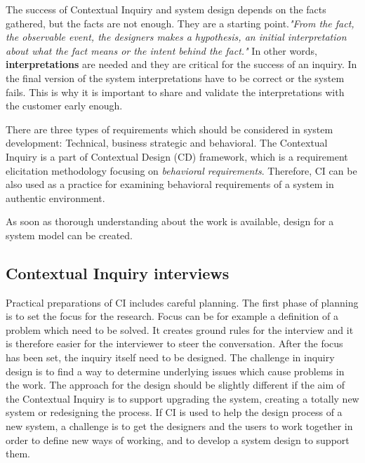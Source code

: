 \documentclass[12pt,a4paper,oneside,pdftex]{report}
\begin{document}
The success of Contextual Inquiry and system design depends on the facts gathered, but the facts are not enough. They are a starting point.\textit{"From the fact, the observable event, the designers makes a hypothesis, an initial interpretation about what the fact means or the intent behind the fact."}\cite{RefWorks:21} In other words, \textbf{interpretations} are needed and they are critical for the success of an inquiry. In the final version of the system interpretations have to be correct or the system fails. This is why it is important to share and validate the interpretations with the customer early enough. \cite{RefWorks:21}

There are three types of requirements which should be considered in system development: Technical, business strategic and behavioral. The Contextual Inquiry is a part of Contextual Design (CD) framework, which is a requirement elicitation methodology focusing on  \emph{behavioral requirements}. Therefore, CI can be also used as a practice for examining behavioral requirements of a system in authentic environment. \cite{RefWorks:33}

As soon as thorough understanding about the work is available, design for a system model can be created.\cite{RefWorks:14} 

\subsection{Contextual Inquiry interviews}

Practical preparations of CI includes careful planning. The first phase of planning is to set the focus for the research. Focus can be for example a definition of a problem which need to be solved. It creates ground rules for the interview and it is therefore easier for the interviewer to steer the conversation. After the focus has been set, the inquiry itself need to be designed. The challenge in inquiry design is to find a way to determine underlying issues which cause problems in the work. The approach for the design should be slightly different if the aim of the Contextual Inquiry is to support upgrading the system, creating a totally new system or redesigning the process. If CI is used to help the design process of a new system, a challenge is to get the designers and the users to work together in order to define new ways of working, and to develop a system design to support them. \cite{RefWorks:21} 
\end{document}
